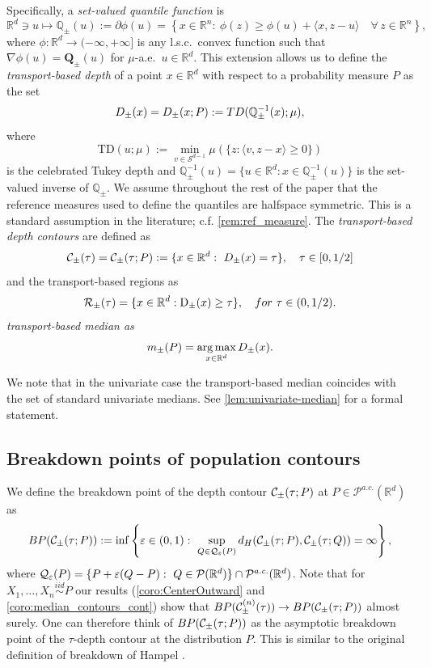 \documentclass[11pt]{article}
\DeclareMathOperator*{\argmax}{arg\,max}
\newcommand{\R}{\mathbb{R}}
\newcommand{\eps}{\varepsilon}
\theoremstyle{plain}
\theoremstyle{definition}
\begin{document}
%
Specifically, a {\it set-valued quantile function} is 
\[
\R^d\ni u\mapsto \mathbb{Q}_\pm (u):=\partial \phi(u) = \left\{ x \in \mathbb{R}^n :
 \ \phi(z) \geq \phi(u) + \langle x, z - u \rangle \quad \forall\, z \in \mathbb{R}^n \right\},
\]
where $\phi:\R^d\to (-\infty, +\infty]$ is any l.s.c.\  convex function such that $\nabla \phi(u)= \mathbf{Q}_{ \pm }(u)$ for $\mu$-a.e.\ $u\in \R^d$.  This extension allows us to define the {\it transport-based depth}  of a point $x\in \R^d$  with respect to  a probability measure $P$ as the set
 $$ {\rm D}_\pm(x)={\rm D}_\pm(x;P):={\rm TD}( \mathbb{Q}_{ \pm }^{-1} (x); \mu), $$ 
where 
$$ \mathrm{TD}(u; \mu):= \min_{v\in \mathcal{S}^{d-1}} \mu\left( \{z: \langle v, z - x \rangle \geq 0\} \right) $$
is the celebrated Tukey depth and 
$ \mathbb{Q}_{ \pm }^{-1}(u)=\{u\in \R^d:  x\in \mathbb{Q}_{ \pm }^{-1} (u)\}  $ is the set-valued inverse of $ \mathbb{Q}_{ \pm }$.  We assume throughout the rest of the paper that the reference measures used to define the quantiles are halfspace symmetric. This is a standard assumption in the literature; c.f.  \autoref{rem:ref_measure}.  
The {\it transport-based depth  contours} are defined as
$$ {\cal  C}_\pm(\tau)=\mathcal{C}_\pm(\tau; P):=\{x\in \R^d: \ {\rm D}_\pm(x)=\tau \}, \quad \tau\in [0,1/2]$$ 
and the transport-based regions as
$$\mathcal{R}_{\pm}(\tau)= \{x\in\mathbb{R}^d: \mathrm{D}_\pm (x)\geq \tau\}, \quad {\rm for} \ \tau\in (0,1/2).$$
{\it transport-based median as} 
$$m_\pm(P)=\argmax_{x\in\mathbb{R}^d}{\rm D}_\pm(x).$$

 {
We note that in the univariate case the transport-based median  coincides with the set of standard univariate medians. See \autoref{lem:univariate-median} for a formal statement.
}
%

\subsection{Breakdown points of population contours}\label{Sect:breakdownSet}


%
 We define the breakdown point of the depth contour ${\cal  C}_\pm(\tau;P )$ at   $P\in \mathcal{P}^{a.c.}(\R^d)$ as
    $${\rm BP}({\cal  C}_\pm(\tau;P )):= \inf \left\{ \varepsilon\in (0,1): \ \sup_{Q\in \mathcal{Q}_{\varepsilon}(P)} d_H(\mathcal{C}_\pm(\tau; P), \mathcal{C}_\pm(\tau; Q))= \infty\right \},
$$
%
 where ${\cal Q}_\eps(P)=\{ P+\eps (Q-P): \ Q\in \mathcal{P}(\R^d)\}\cap \mathcal{P}^{a.c.}(\R^d)$. Note that for $X_1,\dots,X_n\overset{iid}{\sim}P$ our results (\autoref{coro:CenterOutward} and \autoref{coro:median_contours_cont}) show that ${\rm BP}({\cal  C}_\pm^{(n)}(\tau)) \to {\rm BP}({\cal C}_{\pm}(\tau;P ))$ almost surely. One can therefore think of ${\rm BP}({\cal  C}_\pm(\tau;P ))$ as the asymptotic breakdown point of the $\tau$-depth contour at the distribution $P$.  This is  similar to the original definition of breakdown of Hampel \cite{hampel1971}.
 
\end{document}
